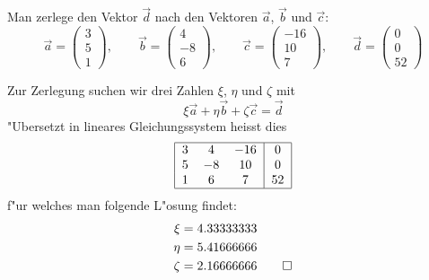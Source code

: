 Man zerlege den Vektor $\vec d$ nach den Vektoren $\vec a$, $\vec b$ und
$\vec c$:
\[
\vec a=\begin{pmatrix}3\\5\\1\end{pmatrix},\qquad
\vec b=\begin{pmatrix}4\\-8\\6\end{pmatrix},\qquad
\vec c=\begin{pmatrix}-16\\10\\7\end{pmatrix},\qquad
\vec d=\begin{pmatrix}0\\0\\52\end{pmatrix}
\]

\begin{loesung}
Zur Zerlegung suchen wir drei Zahlen $\xi$, $\eta$ und $\zeta$ mit
\[
\xi \vec a
+
\eta \vec b
+
\zeta \vec c
=
\vec d
\]
"Ubersetzt in lineares Gleichungssystem heisst dies
\[
\begin{tabular}{|ccc|c|}
\hline
3&4&$-16$&0\\
5&$-8$&10&0\\
1&6&7&52\\
\hline
\end{tabular}
\]
f"ur welches man folgende L"osung findet:
\begin{align*}
\xi&=4.33333333\\
\eta&=5.41666666\\
\zeta&=2.16666666
\qedhere
\end{align*}
\end{loesung}


